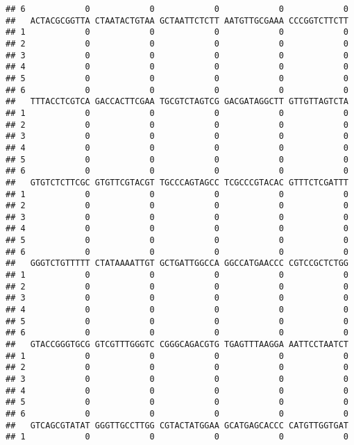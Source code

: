 \documentclass[]{article}
\begin{document}
\begin{verbatim}
## 6            0            0            0            0            0
##   ACTACGCGGTTA CTAATACTGTAA GCTAATTCTCTT AATGTTGCGAAA CCCGGTCTTCTT
## 1            0            0            0            0            0
## 2            0            0            0            0            0
## 3            0            0            0            0            0
## 4            0            0            0            0            0
## 5            0            0            0            0            0
## 6            0            0            0            0            0
##   TTTACCTCGTCA GACCACTTCGAA TGCGTCTAGTCG GACGATAGGCTT GTTGTTAGTCTA
## 1            0            0            0            0            0
## 2            0            0            0            0            0
## 3            0            0            0            0            0
## 4            0            0            0            0            0
## 5            0            0            0            0            0
## 6            0            0            0            0            0
##   GTGTCTCTTCGC GTGTTCGTACGT TGCCCAGTAGCC TCGCCCGTACAC GTTTCTCGATTT
## 1            0            0            0            0            0
## 2            0            0            0            0            0
## 3            0            0            0            0            0
## 4            0            0            0            0            0
## 5            0            0            0            0            0
## 6            0            0            0            0            0
##   GGGTCTGTTTTT CTATAAAATTGT GCTGATTGGCCA GGCCATGAACCC CGTCCGCTCTGG
## 1            0            0            0            0            0
## 2            0            0            0            0            0
## 3            0            0            0            0            0
## 4            0            0            0            0            0
## 5            0            0            0            0            0
## 6            0            0            0            0            0
##   GTACCGGGTGCG GTCGTTTGGGTC CGGGCAGACGTG TGAGTTTAAGGA AATTCCTAATCT
## 1            0            0            0            0            0
## 2            0            0            0            0            0
## 3            0            0            0            0            0
## 4            0            0            0            0            0
## 5            0            0            0            0            0
## 6            0            0            0            0            0
##   GTCAGCGTATAT GGGTTGCCTTGG CGTACTATGGAA GCATGAGCACCC CATGTTGGTGAT
## 1            0            0            0            0            0

\end{verbatim}
\end{document}
